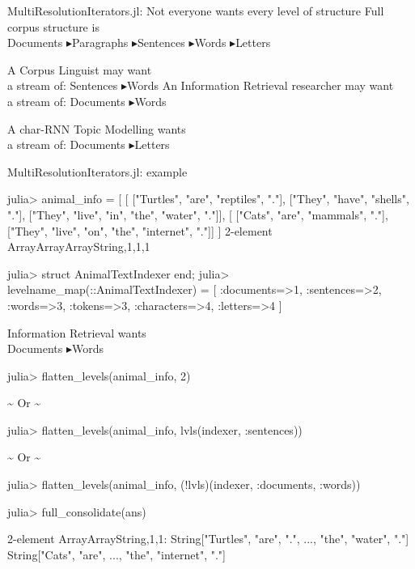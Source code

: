 \documentclass[dvipsnames]{beamer}
\let\oldnote\note
\renewcommand{\note}{\oldnote[item]}
\begin{document}
\def\madeupof{$\blacktriangleright$}
\begin{frame}[fragile]{MultiResolutionIterators.jl: Not everyone wants every level of structure}
	\alert{Full corpus structure} is\\
	Documents \madeupof Paragraphs \madeupof Sentences \madeupof Words \madeupof Letters
	\vfill
	
	A \alert{Corpus Linguist} may want\note{studying word usage}\\
	a stream of: Sentences \madeupof Words
	\vfill
	An \alert{Information Retrieval} researcher may want\\
	a stream of: {Documents} \madeupof {Words}
		
	\vfill
	A \alert{char-RNN} Topic Modelling wants\\
	a stream of: {Documents} \madeupof {Letters}
\end{frame}

\begin{frame}[fragile]{MultiResolutionIterators.jl: example}
	\color{Green}
	\begin{code}
		julia> animal_info = [
		[	["Turtles", "are", "reptiles", "."],
			["They", "have", "shells", "."],
			["They", "live", "in", "the", "water", "."]],
		[	["Cats", "are", "mammals", "."],
			["They", "live", "on", "the", "internet", "."]]
		]
		2-element Array{Array{Array{String,1},1},1}
	\end{code}
	\color{Orange}
	\begin{code}
		julia>  struct AnimalTextIndexer end;
		julia> 	levelname_map(::AnimalTextIndexer) = [
			:documents=>1,
			:sentences=>2,
			:words=>3, :tokens=>3,
			:characters=>4, :letters=>4
		]
	\end{code}

\end{frame}

\newcommand{\ormark}{\vspace{-0.5em}\hfill \textasciitilde{} Or \textasciitilde{} \hfill \null \vspace{-0.5em}}
\begin{frame}[fragile]{Information Retrieval wants\\ {Documents} \madeupof {Words}}
	\color{Purple}
	\small
	\begin{code}
		julia> flatten_levels(animal_info, 2)
	\end{code}
		\ormark{}
	\begin{code}
		julia> flatten_levels(animal_info,
					lvls(indexer, :sentences))
	\end{code}
		\ormark{}
	\begin{code}					
		julia> flatten_levels(animal_info, 
					(!lvls)(indexer, :documents, :words))
	\end{code}
	\color{Green}
	\begin{code}
		julia> full_consolidate(ans)
		
		2-element Array{Array{String,1},1}:
		String["Turtles", "are", ".", ...,  "the", "water", "."]
		String["Cats", "are", ..., "the", "internet", "."]
	\end{code}
\end{frame}
\end{document}
